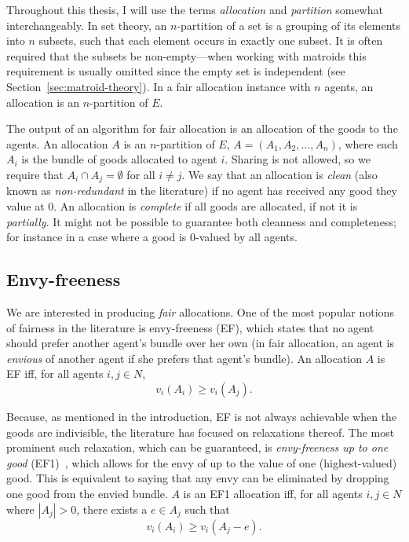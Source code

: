 Throughout this thesis, I will use the terms \textit{allocation} and \textit{partition} somewhat interchangeably. In set theory, an $n$-partition of a set is a grouping of its elements into $n$ subsets, such that each element occurs in exactly one subset. It is often required that the subsets be non-empty---when working with matroids this requirement is usually omitted since the empty set is independent (see Section~\ref{sec:matroid-theory}). In a fair allocation instance with $n$ agents, an allocation is an $n$-partition of $E$. 

The output of an algorithm for fair allocation is an allocation of the goods to the agents. An allocation $A$ is an $n$-partition of $E$, $A = (A_1, A_2, \dots, A_n)$, where each $A_i$ is the bundle of goods allocated to agent $i$. Sharing is not allowed, so we require that $A_i\cap A_j = \emptyset$ for all $i\neq j$. We say that an allocation is \textit{clean} (also known as \textit{non-redundant} in the literature) if no agent has received any good they value at 0. An allocation is \textit{complete} if all goods are allocated, if not it is \textit{partially}. It might not be possible to guarantee both cleanness and completeness; for instance in a case where a good is 0-valued by all agents.

\subsection{Envy-freeness}
We are interested in producing \textit{fair} allocations. One of the most popular notions of fairness in the literature is envy-freeness (EF), which states that no agent should prefer another agent's bundle over her own (in fair allocation, an agent is \textit{envious} of another agent if she prefers that agent's bundle). An allocation $A$ is EF iff, for all agents $i,j\in N$,
\begin{equation} \tag{EF}
  v_i(A_i) \geq v_i(A_j).
\end{equation}

Because, as mentioned in the introduction, EF is not always achievable when the goods are indivisible, the literature has focused on relaxations thereof. The most prominent such relaxation, which can be guaranteed, is \textit{envy-freeness up to one good} (EF1)~\cite{lipton-2004}, which allows for the envy of up to the value of one (highest-valued) good. This is equivalent to saying that any envy can be eliminated by dropping one good from the envied bundle. $A$ is an EF1 allocation iff, for all agents $i,j \in N$ where $|A_j| > 0$, there exists a $e \in A_j$ such that
\begin{equation} \tag{EF1}
  v_i(A_i) \geq v_i(A_j - e).
\end{equation}


